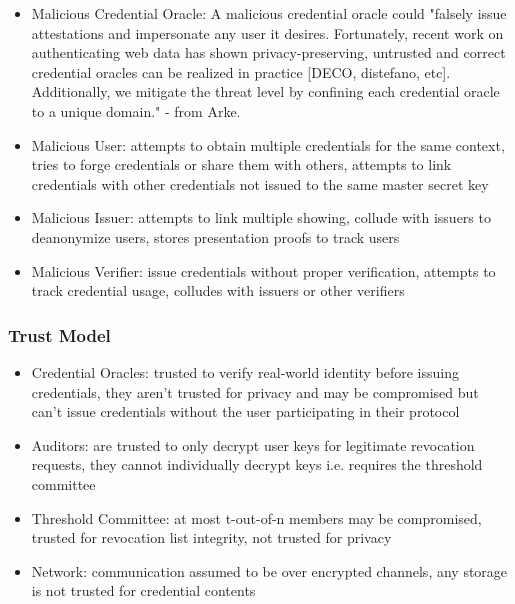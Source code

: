 \begin{itemize}
    \item Malicious Credential Oracle: A malicious credential oracle could "falsely issue attestations and impersonate any user it desires. Fortunately, recent work on authenticating web data has shown privacy-preserving, untrusted and correct credential oracles can be realized in practice [DECO, distefano, etc]. Additionally, we mitigate the threat level by confining each credential oracle to a unique domain." - from Arke. 
    \item Malicious User: attempts to obtain multiple credentials for the same context, tries to forge credentials or share them with others, attempts to link credentials with other credentials not issued to the same master secret key
    \item Malicious Issuer: attempts to link multiple showing, collude with issuers to deanonymize users, stores presentation proofs to track users
    \item Malicious Verifier: issue credentials without proper verification, attempts to track credential usage, colludes with issuers or other verifiers
\end{itemize}

\subsubsection{Trust Model}
\begin{itemize}
    \item Credential Oracles: trusted to verify real-world identity before issuing credentials, they aren't trusted for privacy and may be compromised but can't issue credentials without the user participating in their protocol

    \item Auditors: are trusted to only decrypt user keys for legitimate revocation requests, they cannot individually decrypt keys i.e. requires the threshold committee

    \item Threshold Committee: at most t-out-of-n members may be compromised, trusted for revocation list integrity, not trusted for privacy

    \item Network: communication assumed to be over encrypted channels, any storage is not trusted for credential contents
\end{itemize}






